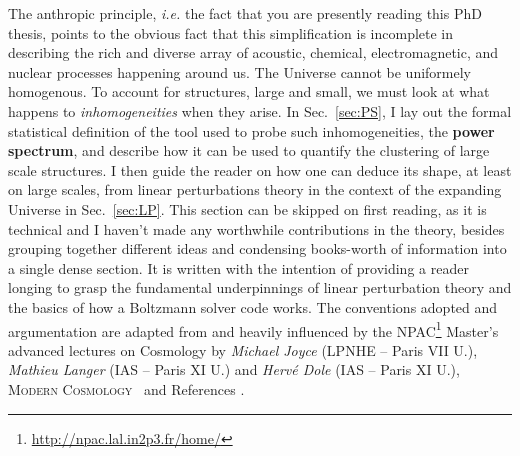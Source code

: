 \begin{intro}
The anthropic principle, \textit{i.e.} the fact that you are presently reading this PhD thesis, points to the obvious fact that this simplification is incomplete in describing the rich and diverse array of acoustic, chemical, electromagnetic, and nuclear processes happening around us. The Universe cannot be uniformely homogenous. To account for structures, large and small, we must look at what happens to \emph{inhomogeneities} when they arise. In Sec.~\ref{sec:PS}, I lay out the formal statistical definition of the tool used to probe such inhomogeneities, the \textbf{power spectrum}, and describe how it can be used to quantify the clustering of large scale structures. I then guide the reader on how one can deduce its shape, at least on large scales, from linear perturbations theory in the context of the expanding Universe in Sec.~\ref{sec:LP}. This section can be skipped on first reading, as it is technical and I haven't made any worthwhile contributions in the theory, besides grouping together different ideas and condensing books-worth of information into a single dense section. It is written with the intention of providing a reader longing to grasp the fundamental underpinnings of linear perturbation theory and the basics of how a Boltzmann solver code works. The conventions adopted and argumentation are adapted from and heavily influenced by the NPAC\footnote{\url{http://npac.lal.in2p3.fr/home/}} Master's advanced lectures on Cosmology by \textit{Michael Joyce} (LPNHE -- Paris VII U.), \textit{Mathieu Langer} (IAS -- Paris XI U.) and \textit{Herv\'e Dole} (IAS -- Paris XI U.), \textsc{Modern Cosmology}~\citep{DodelsonBook} and References \cite{MaBe94, LESGOURGUES2006, BLR09, Wong2011, Pastor2011, LP2012, Abaz_review_2017}. \\



\end{intro}
